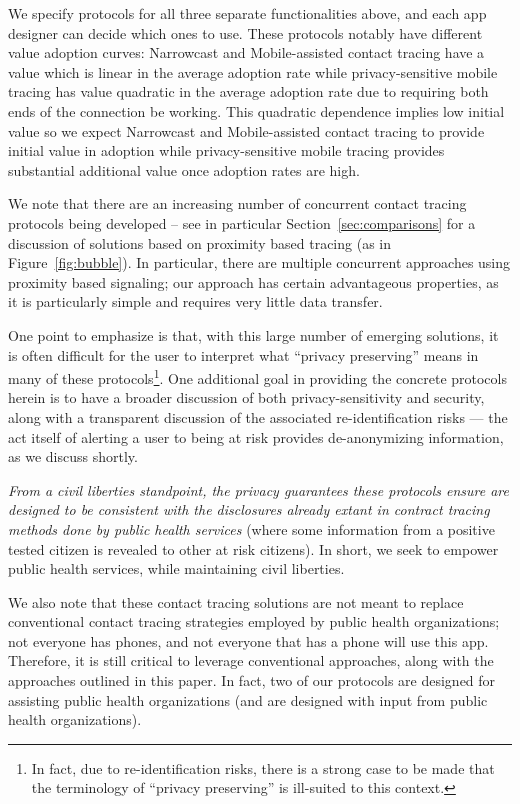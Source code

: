 \documentclass{article}
\begin{document}
 We specify protocols for all three separate functionalities above, and each app designer can decide which ones to use.  These protocols notably have different value adoption curves: Narrowcast and Mobile-assisted contact tracing have a value which is linear in the average adoption rate while privacy-sensitive mobile tracing has value quadratic in the average adoption rate due to requiring both ends of the connection be working.  This quadratic dependence implies low initial value so we expect  Narrowcast and Mobile-assisted contact tracing to provide initial value in adoption while privacy-sensitive mobile tracing provides substantial additional value once adoption rates are high.
 
 We note that there are an increasing number of concurrent contact tracing protocols being developed -- see in particular Section~\ref{sec:comparisons} for a discussion of solutions based on proximity based tracing (as in Figure~\ref{fig:bubble}).  In particular, there are multiple concurrent approaches using proximity based signaling; our approach has certain advantageous properties, as it is particularly simple and requires very little data transfer.
 
One point to emphasize is that, with this large number of emerging solutions, it is often difficult for the user to interpret what ``privacy preserving'' means in many of these protocols\footnote{In fact, due to re-identification risks, there is a strong case to be made that the terminology of ``privacy preserving'' is ill-suited to this context.}. One additional goal in providing the concrete protocols herein is to  have a broader discussion of both privacy-sensitivity and security, along with a transparent discussion of the associated re-identification risks ---  the act itself of alerting a user to being at risk provides de-anonymizing information, as we discuss shortly.  

 
 \emph{From a civil liberties standpoint, the privacy guarantees these protocols ensure are designed to be consistent with the disclosures already extant in contract tracing methods done by public health services} (where some information from a positive tested citizen is revealed to other at risk citizens). In short, we seek to empower public health services, while maintaining civil liberties.
 
We also note that these contact tracing solutions are not meant to replace conventional contact tracing strategies employed by public health organizations; not everyone has phones, and not everyone that has a phone will use this app. Therefore, it is still critical to leverage conventional approaches, along with the approaches outlined in this paper. In fact, two of our protocols are designed for assisting public health organizations (and are designed with input from public health organizations).
\end{document}
